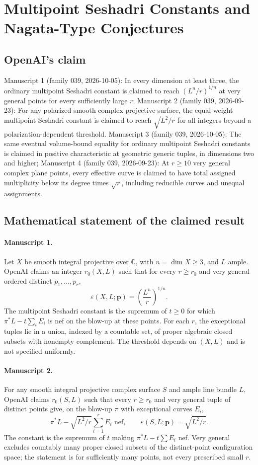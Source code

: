 \documentclass[11pt]{article}
\begin{document}
\section*{Multipoint Seshadri Constants and Nagata-Type Conjectures}

\subsection{OpenAI's claim}
Manuscript 1 (family 039, 2026-10-05): In every dimension at least three, the ordinary multipoint Seshadri constant is claimed to reach $(L^n/r)^{1/n}$ at very general points for every sufficiently large $r$; Manuscript 2 (family 039, 2026-09-23): For any polarized smooth complex projective surface, the equal-weight multipoint Seshadri constant is claimed to reach $\sqrt{L^2/r}$ for all integers beyond a polarization-dependent threshold. Manuscript 3 (family 039, 2026-10-05): The same eventual volume-bound equality for ordinary multipoint Seshadri constants is claimed in positive characteristic at geometric generic tuples, in dimensions two and higher; Manuscript 4 (family 039, 2026-09-23): At $r\ge10$ very general complex plane points, every effective curve is claimed to have total assigned multiplicity below its degree times $\sqrt r$, including reducible curves and unequal assignments.

\subsection{Mathematical statement of the claimed result}
\paragraph{Manuscript 1.}
Let $X$ be smooth integral projective over $\mathbb C$, with $n=\dim X\ge3$, and $L$ ample. OpenAI claims an integer $r_0(X,L)$ such that for every $r\ge r_0$ and very general ordered distinct $p_1,\ldots,p_r$,
\[
\varepsilon(X,L;\mathbf p)=\left(\frac{L^n}{r}\right)^{1/n}.
\]
The multipoint Seshadri constant is the supremum of $t\ge0$ for which $\pi^*L-t\sum_iE_i$ is nef on the blow-up at these points. For each $r$, the exceptional tuples lie in a union, indexed by a countable set, of proper algebraic closed subsets with nonempty complement. The threshold depends on $(X,L)$ and is not specified uniformly.

\paragraph{Manuscript 2.}
For any smooth integral projective complex surface $S$ and ample line bundle $L$, OpenAI claims $r_0(S,L)$ such that every $r\ge r_0$ and very general tuple of distinct points give, on the blow-up $\pi$ with exceptional curves $E_i$,
\[
\pi^*L-\sqrt{L^2/r}\sum_{i=1}^rE_i\text{ nef},\qquad
\varepsilon(S,L;\mathbf p)=\sqrt{L^2/r}.
\]
The constant is the supremum of $t$ making $\pi^*L-t\sum E_i$ nef. Very general excludes countably many proper closed subsets of the distinct-point configuration space; the statement is for sufficiently many points, not every prescribed small $r$.
\end{document}
